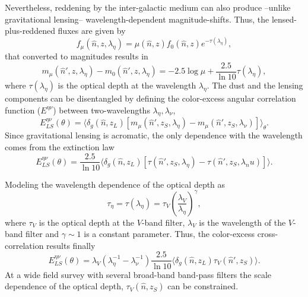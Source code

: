 Nevertheless, reddening by the inter-galactic medium  can also produce --unlike gravitational lensing-- wavelength-dependent magnitude-shifts. Thus, the lensed-plus-reddened fluxes are given by
\begin{equation}
f_\mu(\hat n,z,\lambda_\eta) = \mu(\hat n,z)f_0(\hat n,z)e^{-\tau(\lambda_\eta)},
\end{equation}
that converted to magnitudes results in
\begin{equation}
m_\mu(\hat n',z,\lambda_\eta)-m_0(\hat n',z,\lambda_\eta)=-2.5\log\mu+\frac{2.5}{\ln 10}\tau(\lambda_\eta),
\end{equation}
where $\tau(\lambda_\eta)$ is the optical depth at the wavelength $\lambda_\eta$. The dust and the lensing components can be disentangled by defining the color-excess angular correlation function ($E^{\eta\nu}$) between two-wavelengths $\lambda_\eta,\lambda_\nu$,
\begin{equation}
E^{\eta\nu}_{LS}(\theta) = \langle\delta_g(\hat n,z_L)[m_\mu(\hat n',z_S,\lambda_\eta)-m_\mu(\hat n',z_S,\lambda_\nu)]\rangle_\theta.
\end{equation}
Since gravitational lensing is acromatic, the only dependence with the wavelength comes from the extinction law
\begin{equation}
E^{\eta\nu}_{LS}(\theta)=\frac{2.5}{\ln 10}\langle\delta_g(\hat n,z_L)[\tau(\hat n',z_S,\lambda_\eta)-\tau(\hat n',z_S,\lambda_nu)]\rangle.
\end{equation}

Modeling the wavelength dependence of the optical depth as \cite{2010MNRAS.405.1025M}
\begin{equation}
\tau_\eta = \tau(\lambda_\eta) = \tau_V\left(\frac{\lambda_V}{\lambda_\eta}\right)^\gamma,
\end{equation}
where $\tau_V$ is the optical depth at the $V$-band filter, $\lambda_V$ is the wavelength of the $V$-band filter and $\gamma\sim 1$ is a constant parameter. Thus, the color-excess cross-correlation results finally
\begin{equation}
E^{\eta\nu}_{LS}(\theta)=\lambda_V(\lambda_\eta^{-1}-\lambda_\nu^{-1})\frac{2.5}{\ln 10}\langle\delta_g(\hat n,z_L)\tau_V(\hat n',z_S)\rangle.
\end{equation}
At a wide field survey with several broad-band band-pass filters the scale dependence of the optical depth, $\tau_V(\hat n,z_S)$ can be constrained.

